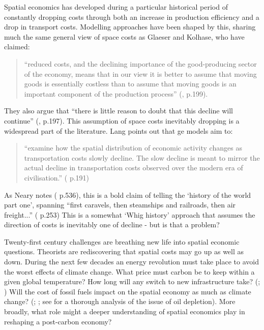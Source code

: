 Spatial economics has developed during a particular historical period of constantly dropping costs through both an increase in production efficiency and a drop in transport costs. Modelling approaches have been shaped by this, sharing much the same general view of space costs as Glaeser and Kolhase, who have claimed:

\begin{quote}
``reduced costs, and the declining importance of the good-producing sector of the economy, means that in our view it is better to assume that moving goods is essentially costless than to assume that moving goods is an important component of the production process'' (\citealt{glaeser_cities_2004}, p.199).
\end{quote}

They also argue that ``there is little reason to doubt that this decline will continue'' (\citealt{glaeser_cities_2004}, p.197). This assumption of space costs inevitably dropping is a widespread part of the literature. Lang points out that \gls{ge} models aim to:

\begin{quote}
``examine how the spatial distribution of economic activity changes as transportation costs slowly decline. The slow decline is meant to mirror the actual decline in transportation costs observed over the modern era of civilisation.'' (\citealt{lang_heterogeneous_2010} p.191)
\end{quote}

As Neary notes (\citealt{neary_hype_2001} p.536), this is a bold claim of telling the `history of the world part one', spanning ``first caravels, then steamships and railroads, then air freight...'' (\citealt{fujita_spatial_2001} p.253) This is a somewhat `Whig history' approach that assumes the direction of costs is inevitably one of decline -  but is that a problem? 

Twenty-first century challenges are breathing new life into spatial economic questions. Theorists are rediscovering that spatial costs may go up as well as down. During the next few decades an energy revolution must take place to avoid the worst effects of climate change. What price must carbon be to keep within a given global temperature? How long will any switch to new infrastructure take? (\citealt{kramer_no_2009}; \citealt{jefferson_accelerating_2008}) Will the cost of fossil fuels impact on the spatial economy as much as climate change? (\citealt{wilkinson_peak_2008}; \citealt{bridge_geographies_2010}; see \citealt{sorrell_assessment_2009} for a thorough analysis of the issue of oil depletion). More broadly, what role might a deeper understanding of spatial economics play in reshaping a post-carbon economy?

